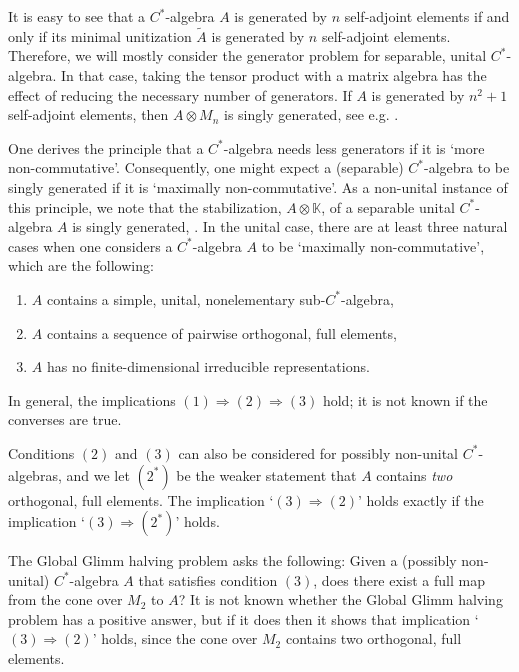 \documentclass{amsart}
\theoremstyle{definition}
\begin{document}
    It is easy to see that a {{$C^*$-al\-ge\-bra}}{} $A$ is generated by $n$ self-adjoint elements if and only if its minimal unitization $\widetilde{A}$ is generated by $n$ self-adjoint elements.
    Therefore, we will mostly consider the generator problem for separable, unital {{$C^*$-al\-ge\-bra}}{}.
    In that case, taking the tensor product with a matrix algebra has the effect of reducing the necessary number of generators.
    If $A$ is generated by $n^2+1$ self-adjoint elements, then $A\otimes M_n$ is singly generated, see e.g. \cite[Theorem 3]{Nag2004}.

    One derives the principle that a {{$C^*$-al\-ge\-bra}}{} needs less generators if it is `more non-commutative'.
    Consequently, one might expect a (separable) {{$C^*$-al\-ge\-bra}}{} to be singly generated if it is `maximally non-commutative'.
    As a non-unital instance of this principle, we note that the stabilization, $A\otimes{{\mathbb{K}}}$, of a separable unital {{$C^*$-al\-ge\-bra}}{} $A$ is singly generated, \cite[Theorem 8]{OlsZam1976}.
    In the unital case, there are at least three natural cases when one considers a {{$C^*$-al\-ge\-bra}}{} $A$ to be `maximally non-commutative', which are the following:
    \begin{enumerate}[\quad (1)  ]
        \item
        $A$ contains a simple, unital, nonelementary sub-{{$C^*$-al\-ge\-bra}}{},
        \item
        $A$ contains a sequence of pairwise orthogonal, full elements,
        \item
        $A$ has no finite-dimensional irreducible representations.
    \end{enumerate}

    In general, the implications $(1)\Rightarrow(2)\Rightarrow(3)$ hold; it is not known if the converses are true.

    Conditions $(2)$ and $(3)$ can also be considered for possibly non-unital {{$C^*$-al\-ge\-bra}}{s},
    and we let $(2^*)$ be the weaker statement that $A$ contains \emph{two} orthogonal, full elements.
    The implication `$(3)\Rightarrow(2)$' holds exactly if the implication `$(3)\Rightarrow(2^*)$' holds.

    The Global Glimm halving problem asks the following:
    Given a (possibly non-unital) {{$C^*$-al\-ge\-bra}}{} $A$ that satisfies condition $(3)$, does there exist a full map from the cone over $M_2$ to $A$?
    It is not known whether the Global Glimm halving problem has a positive answer,
    but if it does then it shows that implication `$(3)\Rightarrow(2)$' holds, since the cone over $M_2$ contains two orthogonal, full elements.
\end{document}
